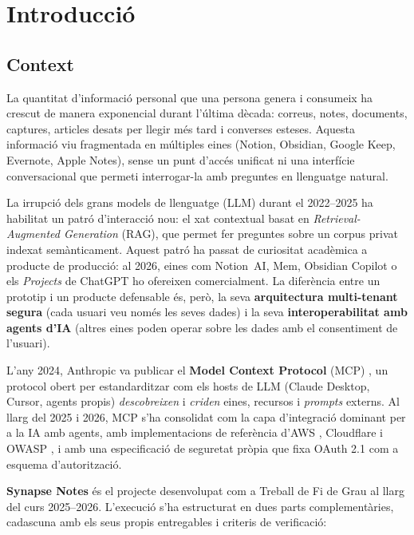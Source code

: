 \chapter{Introducció}
\label{ch:introduccio}

\section{Context}
\label{sec:context}

La quantitat d'informació personal que una persona genera i consumeix ha
crescut de manera exponencial durant l'última dècada: correus, notes,
documents, captures, articles desats per llegir més tard i converses
esteses. Aquesta informació viu fragmentada en múltiples eines
(Notion, Obsidian, Google Keep, Evernote, Apple Notes), sense un punt
d'accés unificat ni una interfície conversacional que permeti
interrogar-la amb preguntes en llenguatge natural.

La irrupció dels grans models de llenguatge (LLM) durant el 2022--2025
ha habilitat un patró d'interacció nou: el xat contextual basat en
\emph{Retrieval-Augmented Generation} (RAG), que permet fer preguntes
sobre un corpus privat indexat semànticament. Aquest patró ha passat de
curiositat acadèmica a producte de producció: al 2026, eines com
Notion~AI, Mem, Obsidian Copilot o els \emph{Projects} de ChatGPT ho
ofereixen comercialment. La diferència entre un prototip i un producte
defensable és, però, la seva \textbf{arquitectura multi-tenant segura}
(cada usuari veu només les seves dades) i la seva
\textbf{interoperabilitat amb agents d'IA} (altres eines poden operar
sobre les dades amb el consentiment de l'usuari).

L'any 2024, Anthropic va publicar el \textbf{Model Context Protocol}
(MCP) \autocite{anthropic2024mcp}, un protocol obert per estandarditzar
com els hosts de LLM (Claude Desktop, Cursor, agents propis)
\emph{descobreixen} i \emph{criden} eines, recursos i \emph{prompts}
externs. Al llarg del 2025 i 2026, MCP s'ha consolidat com la capa
d'integració dominant per a la IA amb agents, amb implementacions de
referència d'AWS \autocite{aws2026mcp}, Cloudflare
\autocite{cloudflare2026agents} i OWASP \autocite{owasp2026mcp}, i amb
una especificació de seguretat pròpia
\autocite{mcpspec2026security,mcpspec2026auth} que fixa
OAuth 2.1 com a esquema d'autorització.

\textbf{Synapse Notes} és el projecte desenvolupat com a Treball de
Fi de Grau al llarg del curs 2025--2026. L'execució s'ha estructurat
en dues parts complementàries, cadascuna amb els seus propis
entregables i criteris de verificació:

